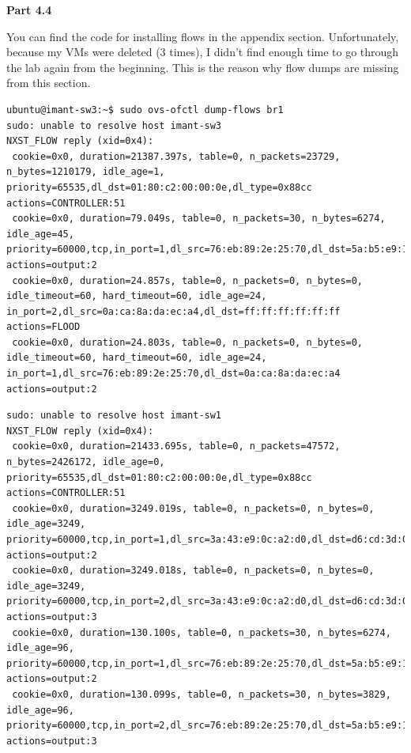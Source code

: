 \documentclass[12pt]{article}
\begin{document}
\vspace{5mm} 
\textbf{Part 4.4}

\vspace{2mm} 

You can find the code for installing flows in the appendix section. Unfortunately,
because my VMs were deleted (3 times), I didn't find enough time to go through
the lab again from the beginning. This is the reason why flow dumps are missing
from this section.

\begin{verbatim}
ubuntu@imant-sw3:~$ sudo ovs-ofctl dump-flows br1
sudo: unable to resolve host imant-sw3
NXST_FLOW reply (xid=0x4):
 cookie=0x0, duration=21387.397s, table=0, n_packets=23729, n_bytes=1210179, idle_age=1, priority=65535,dl_dst=01:80:c2:00:00:0e,dl_type=0x88cc actions=CONTROLLER:51
 cookie=0x0, duration=79.049s, table=0, n_packets=30, n_bytes=6274, idle_age=45, priority=60000,tcp,in_port=1,dl_src=76:eb:89:2e:25:70,dl_dst=5a:b5:e9:15:cc:ec,tp_dst=80 actions=output:2
 cookie=0x0, duration=24.857s, table=0, n_packets=0, n_bytes=0, idle_timeout=60, hard_timeout=60, idle_age=24, in_port=2,dl_src=0a:ca:8a:da:ec:a4,dl_dst=ff:ff:ff:ff:ff:ff actions=FLOOD
 cookie=0x0, duration=24.803s, table=0, n_packets=0, n_bytes=0, idle_timeout=60, hard_timeout=60, idle_age=24, in_port=1,dl_src=76:eb:89:2e:25:70,dl_dst=0a:ca:8a:da:ec:a4 actions=output:2
\end{verbatim}

\begin{verbatim}
sudo: unable to resolve host imant-sw1
NXST_FLOW reply (xid=0x4):
 cookie=0x0, duration=21433.695s, table=0, n_packets=47572, n_bytes=2426172, idle_age=0, priority=65535,dl_dst=01:80:c2:00:00:0e,dl_type=0x88cc actions=CONTROLLER:51
 cookie=0x0, duration=3249.019s, table=0, n_packets=0, n_bytes=0, idle_age=3249, priority=60000,tcp,in_port=1,dl_src=3a:43:e9:0c:a2:d0,dl_dst=d6:cd:3d:01:c9:ec,tp_dst=80 actions=output:2
 cookie=0x0, duration=3249.018s, table=0, n_packets=0, n_bytes=0, idle_age=3249, priority=60000,tcp,in_port=2,dl_src=3a:43:e9:0c:a2:d0,dl_dst=d6:cd:3d:01:c9:ec,tp_dst=80 actions=output:3
 cookie=0x0, duration=130.100s, table=0, n_packets=30, n_bytes=6274, idle_age=96, priority=60000,tcp,in_port=1,dl_src=76:eb:89:2e:25:70,dl_dst=5a:b5:e9:15:cc:ec,tp_dst=80 actions=output:2
 cookie=0x0, duration=130.099s, table=0, n_packets=30, n_bytes=3829, idle_age=96, priority=60000,tcp,in_port=2,dl_src=76:eb:89:2e:25:70,dl_dst=5a:b5:e9:15:cc:ec,tp_dst=80 actions=output:3
\end{verbatim}
\end{document}
